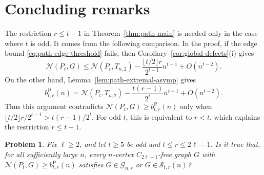 \documentclass[11pt]{article}
\theoremstyle{definition}
\theoremstyle{plain}
\theoremstyle{remark}
\theoremstyle{plain}
\newtheorem{problem}[theorem]{Problem}
\numberwithin{equation}{section}
\newcommand{\cG}{\mathcal G}
\newcommand{\cS}{\mathcal S}
\newcommand{\N}{\mathcal N}
\begin{document}
\section{Concluding remarks}\label{sec:odd-remark}

The restriction $r\le t-1$ in Theorem~\ref{thm:path-main} is needed only in the case where $t$ is odd. It comes from the following comparison. In the proof, if the edge bound \eqref{eq:path-edge-threshold} fails, then Corollary~\ref{cor:global-defects}(i) gives
\[
        \N(P_t,G)\le \N(P_t,T_{n,2})
        -\frac{\lfloor t/2\rfloor r}{2^{t-1}}n^{t-1}
        +O(n^{t-2}).
\]
On the other hand, Lemma~\ref{lem:path-extremal-asymp} gives
\[
        b^{\mathrm P}_{t,r}(n)=\N(P_t,T_{n,2})
        -\frac{t(r-1)}{2^t}n^{t-1}
        +O(n^{t-2}).
\]
Thus this argument contradicts $\N(P_t,G)\ge b^{\mathrm P}_{t,r}(n)$ only when $\lfloor t/2\rfloor r/2^{t-1}>t(r-1)/2^t$. For odd $t$, this is equivalent to $r<t$, which explains the restriction $r\le t-1$.

\begin{problem}\label{prob:odd-path-no-chromatic}
Fix $\ell\ge2$, and let $t\ge5$ be odd and $t\le r\le2\ell-1$. Is it true that, for all sufficiently large $n$, every $n$-vertex $C_{2\ell+1}$-free graph $G$ with $\N(P_t,G)\ge b^{\mathrm P}_{t,r}(n)$ satisfies $G\in\cG_{n,r}$ or $G\in\cS_{t,r}(n)$?
\end{problem}
\end{document}
